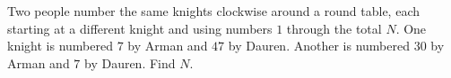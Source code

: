 Two people number the same knights clockwise around a round table, each starting at a different knight and using numbers $1$ through the total $N$. One knight is numbered $7$ by Arman and $47$ by Dauren. Another is numbered $30$ by Arman and $7$ by Dauren. Find $N$.
